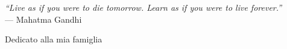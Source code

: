
\cleardoublepage
{}
\thispagestyle{empty}

\vspace*{3cm}

\begin{center}
\textit{``Live as if you were to die tomorrow. Learn as if you were to live forever.''} \\ \medskip
--- Mahatma Gandhi    
\end{center}

\medskip

\begin{center}
Dedicato alla mia famiglia
\end{center}
